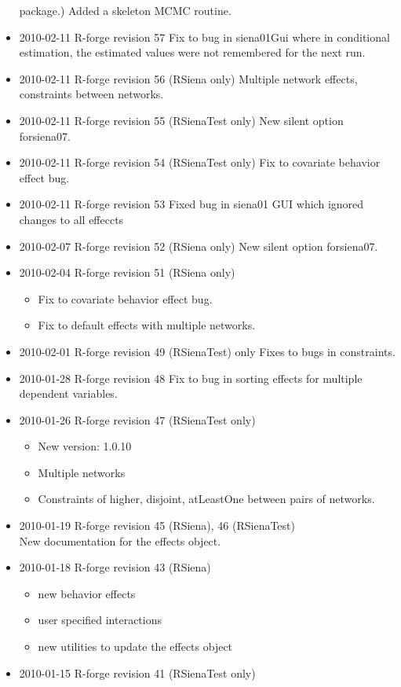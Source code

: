 \documentclass[a4paper,fleqn,11pt]{article}
\newcommand{\+}{\, + \,}
\begin{document}
\begin{small}
\begin{itemize}
  package.) Added a skeleton MCMC routine.
\item 2010-02-11 R-forge revision 57 Fix to bug in siena01Gui where in
  conditional estimation, the
  estimated values were not remembered for the next run.
\item 2010-02-11 R-forge revision 56 (RSiena only)
Multiple network effects, constraints between networks.
\item 2010-02-11 R-forge revision 55 (RSienaTest only)
New silent option for\textsf{siena07}.
\item 2010-02-11 R-forge revision 54 (RSienaTest only)
Fix to covariate behavior effect bug.
\item 2010-02-11 R-forge revision 53
Fixed bug in siena01 GUI which ignored changes to all effeccts
\item 2010-02-07 R-forge revision 52 (RSiena only)
New silent option for\textsf{siena07}.
\item 2010-02-04 R-forge revision 51 (RSiena only)
\begin{itemize}
\item
Fix to covariate behavior effect bug.
\item
Fix to default effects with multiple networks.
\end{itemize}
\item 2010-02-01 R-forge revision 49 (RSienaTest) only
Fixes to bugs in constraints.
\item 2010-01-28 R-forge revision 48
Fix to bug in sorting effects for multiple dependent variables.
\item 2010-01-26 R-forge revision 47 (RSienaTest only)
\begin{itemize}
\item New version: 1.0.10
\item Multiple networks
\item Constraints of higher, disjoint, atLeastOne between pairs of networks.
\end{itemize}
\item 2010-01-19 R-forge revision 45 (RSiena), 46 (RSienaTest)\\
 New documentation for the effects object.
\item 2010-01-18 R-forge revision 43 (RSiena)
\begin{itemize}
\item new behavior effects
\item user specified interactions
\item new utilities to update the effects object
\end{itemize}
\item 2010-01-15 R-forge revision 41 (\textsf{RSienaTest} only)


\end{itemize}
\end{small}
\end{document}
